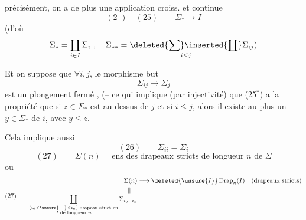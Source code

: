 précisément, on a de plus une application croiss. et continue
\[
(2^\circ)\quad (25)\qquad \Sigma_*\longrightarrow I
\]
(d'où
\[
\Sigma_*=\coprod_{i\in I}\Sigma_i\ ,\quad
\Sigma_{**}=\underset{i\leq j}{\deleted{\sum}\inserted{\coprod}}\Sigma_{ij})
\]

Et on  suppose que $\forall i,j$,  le morphisme but
\[
\Sigma_{ij}\longrightarrow\Sigma_j
\]
est un  plongement fermé , (-- ce qui implique (par injectivité) que (25$^*$) a la propriété que si $z\in\Sigma_*$ est au dessus de $j$ et si $i\leq j$, alors il existe \uline{au plus} un $y\in\Sigma_*$   de $i$, avec $y\leq z$.

Cela implique aussi
\[
(26)\qquad\Sigma_{ii}=\Sigma_i
\]
  
\[
(27)\qquad \Sigma(n)=\text{ens des drapeaux stricts de longueur }n\text{ de }\Sigma
\]
ou
\[
(27)\qquad
\begin{aligned}
\Sigma(n)&\longrightarrow\deleted{\unsure{I}}\operatorname{Drap}_n(I)\quad\text{(drapeaux stricts)}\\
\Vert\quad&\\[-1ex]
\coprod_{\substack{(i_0<\unsure{\cdots}<i_n)\text{ drapeau strict en}\\ I\text{ de longueur }n}}\Sigma_{i_0- i_n}&
\end{aligned}
\]
